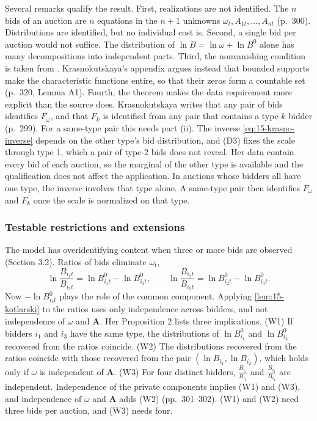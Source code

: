 Several remarks qualify the result. First, realizations are not identified. The $n$ bids of an
auction are $n$ equations in the $n+1$ unknowns $\omega_t,A_{1t},\dots,A_{nt}$ (p.~300). Distributions
are identified, but no individual cost is. Second, a single bid per auction would not suffice. The
distribution of $\ln B=\ln\omega+\ln B^0$ alone has many decompositions into independent parts. Third,
the nonvanishing condition is taken from \citet[Lemma 6.1]{AtheyHaile2007}. Krasnokutskaya's appendix
argues instead that bounded supports make the characteristic functions entire, so that their zeros
form a countable set (p.~320, Lemma A1). Fourth, the theorem makes the data requirement more explicit than the
source does. Krasnokutskaya writes that any pair of bids identifies $F_\omega$, and that $F_k$ is identified from any
pair that contains a type-$k$ bidder (p.~299). For a same-type pair this needs part (ii). The inverse
\eqref{eq:15-krasno-inverse} depends on the other type's bid distribution, and (D3) fixes the scale through
type 1, which a pair of type-2 bids does not reveal. Her data contain every bid of each auction, so the
marginal of the other type is available and the qualification does not affect the application. In auctions
whose bidders all have one type, the inverse involves that type alone. A same-type pair then identifies $F_\omega$
and $F_k$ once the scale is normalized on that type.

\subsubsection{Testable restrictions and extensions}

The model has overidentifying content when three or more bids are observed (Section 3.2). Ratios of
bids eliminate $\omega_t$,
\[
\ln\frac{B_{i_1t}}{B_{i_3t}}=\ln B^0_{i_1t}-\ln B^0_{i_3t},\qquad
\ln\frac{B_{i_2t}}{B_{i_3t}}=\ln B^0_{i_2t}-\ln B^0_{i_3t}.
\]
Now $-\ln B^0_{i_3t}$ plays the role of the common component. Applying \cref{lem:15-kotlarski} to the
ratios uses only independence across bidders, and not independence of $\omega$ and $\bm A$. Her
Proposition 2 lists three implications. (W1) If bidders $i_1$ and $i_3$ have the same type, the
distributions of $\ln B^0_{i_1}$ and $\ln B^0_{i_3}$ recovered from the ratios coincide. (W2) The
distributions recovered from the ratios coincide with those recovered from the pair
$(\ln B_{i_1},\ln B_{i_2})$, which holds only if $\omega$ is independent of $\bm A$. (W3) For four
distinct bidders, $\frac{B_{i_1}}{B_{i_2}}$ and $\frac{B_{i_3}}{B_{i_4}}$ are independent. Independence
of the private components implies (W1) and (W3), and independence of $\omega$ and $\bm A$ adds (W2)
(pp.~301--302). (W1) and (W2) need three bids per auction, and (W3) needs four.

